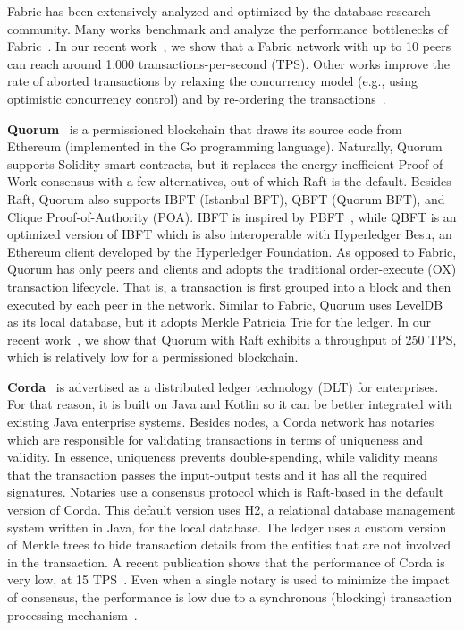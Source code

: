 \documentclass[11pt]{article}
\begin{document}
Fabric has been extensively analyzed and optimized by the database research community. Many works benchmark and analyze the performance bottlenecks of Fabric~\cite{chacko_sigmod21, anh_tkde18, anh_sigmod17, loghin_green2019, loghin_green2022, thakkar_2018}. In our recent work~\cite{loghin_green2022}, we show that a Fabric network with up to 10 peers can reach around 1,000 transactions-per-second (TPS). Other works improve the rate of aborted transactions by relaxing the concurrency model (e.g., using optimistic concurrency control) and by re-ordering the transactions~\cite{rpc_sigmod20, sharma_sigmod19}.


\textbf{Quorum}~\cite{quorum_code} is a permissioned blockchain that draws its source code from Ethereum (implemented in the Go programming language). Naturally, Quorum supports Solidity smart contracts, but it replaces the energy-inefficient Proof-of-Work consensus with a few alternatives, out of which Raft is the default. Besides Raft, Quorum also supports IBFT (Istanbul BFT), QBFT (Quorum BFT), and Clique Proof-of-Authority (POA). IBFT is inspired by PBFT~\cite{pbft}, while QBFT is an optimized version of IBFT which is also interoperable with Hyperledger Besu, an Ethereum client developed by the Hyperledger Foundation. As opposed to Fabric, Quorum has only peers and clients and adopts the traditional order-execute (OX) transaction lifecycle.
That is, a transaction is first grouped into a block and then executed by each peer in the network. Similar to Fabric, Quorum uses LevelDB as its local database, but it adopts Merkle Patricia Trie for the ledger. In our recent work~\cite{loghin_green2022}, we show that Quorum with Raft exhibits a throughput of 250 TPS, which is relatively low for a permissioned blockchain.


\textbf{Corda}~\cite{corda} is advertised as a distributed ledger technology (DLT) for enterprises. For that reason, it is built on Java and Kotlin so it can be better integrated with existing Java enterprise systems. Besides nodes, a Corda network has notaries which are responsible for validating transactions in terms of uniqueness and validity. In essence, uniqueness prevents double-spending, while validity means that the transaction passes the input-output tests and it has all the required signatures. Notaries use a consensus protocol which is Raft-based in the default version of Corda. This default version uses H2, a relational database management system written in Java, for the local database. The ledger uses a custom version of Merkle trees to hide transaction details from the entities that are not involved in the transaction. A recent publication shows that the performance of Corda is very low, at 15 TPS~\cite{perf_iot20}. Even when a single notary is used to minimize the impact of consensus, the performance is low due to a synchronous (blocking) transaction processing mechanism~\cite{perf_iot20}. 
\end{document}
